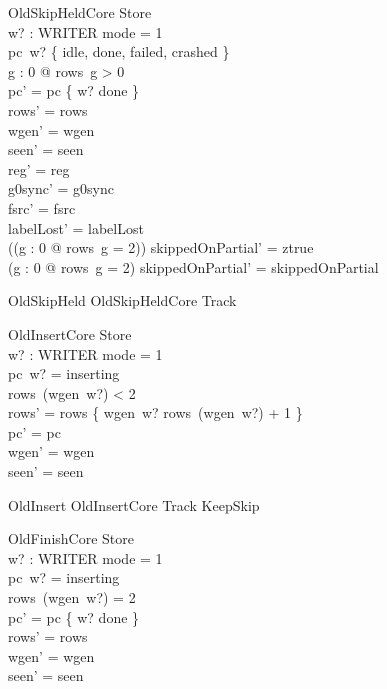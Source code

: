 \documentclass[a4paper,10pt,fleqn]{article}
\begin{document}
\begin{schema}{OldSkipHeldCore}
\Delta Store \\ w? : WRITER
\where
mode = 1 \\
pc~w? \in \{ idle, done, failed, crashed \} \\
\exists g : 0  @ rows~g > 0 \\
pc' = pc \oplus \{ w? \mapsto done \} \\
rows' = rows \\
wgen' = wgen \\
seen' = seen \\
reg' = reg \\
g0sync' = g0sync \\
fsrc' = fsrc \\
labelLost' = labelLost \\
(\lnot (\exists g : 0  @ rows~g = 2)) \implies skippedOnPartial' = ztrue \\
(\exists g : 0  @ rows~g = 2) \implies
  skippedOnPartial' = skippedOnPartial
\end{schema}

\begin{zed}
OldSkipHeld  OldSkipHeldCore \land Track
\end{zed}

\begin{schema}{OldInsertCore}
\Delta Store \\ w? : WRITER
\where
mode = 1 \\
pc~w? = inserting \\
rows~(wgen~w?) < 2 \\
rows' = rows \oplus \{ wgen~w? \mapsto rows~(wgen~w?) + 1 \} \\
pc' = pc \\
wgen' = wgen \\
seen' = seen
\end{schema}

\begin{zed}
OldInsert  OldInsertCore \land Track \land KeepSkip
\end{zed}

\begin{schema}{OldFinishCore}
\Delta Store \\ w? : WRITER
\where
mode = 1 \\
pc~w? = inserting \\
rows~(wgen~w?) = 2 \\
pc' = pc \oplus \{ w? \mapsto done \} \\
rows' = rows \\
wgen' = wgen \\
seen' = seen
\end{schema}
\end{document}
